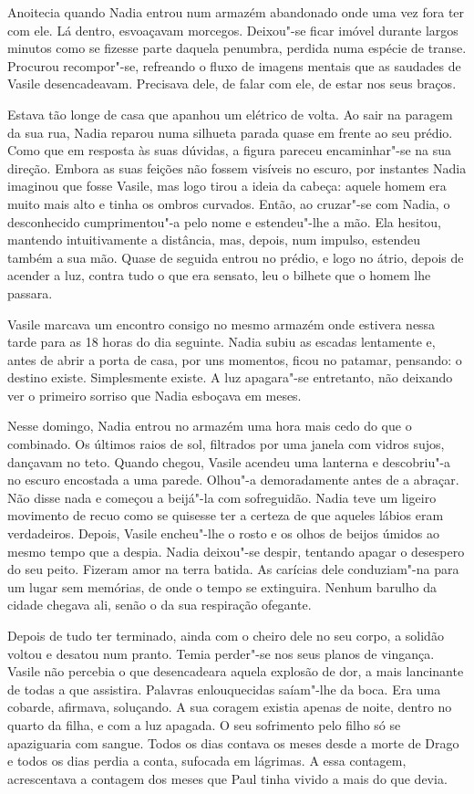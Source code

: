 Anoitecia quando Nadia entrou num armazém abandonado onde uma vez fora
ter com ele. Lá dentro, esvoaçavam morcegos. Deixou"-se ficar imóvel
durante largos minutos como se fizesse parte daquela penumbra, perdida
numa espécie de transe. Procurou recompor"-se, refreando o fluxo de
imagens mentais que as saudades de Vasile desencadeavam. Precisava dele,
de falar com ele, de estar nos seus braços.

Estava tão longe de casa que apanhou um elétrico de volta. Ao sair na
paragem da sua rua, Nadia reparou numa silhueta parada quase em frente
ao seu prédio. Como que em resposta às suas dúvidas, a figura pareceu
encaminhar"-se na sua direção. Embora as suas feições não fossem
visíveis no escuro, por instantes Nadia imaginou que fosse Vasile, mas
logo tirou a ideia da cabeça: aquele homem era muito mais alto e tinha
os ombros curvados. Então, ao cruzar"-se com Nadia, o desconhecido
cumprimentou"-a pelo nome e estendeu"-lhe a mão. Ela hesitou, mantendo
intuitivamente a distância, mas, depois, num impulso, estendeu também a
sua mão. Quase de seguida entrou no prédio, e logo no átrio, depois de
acender a luz, contra tudo o que era sensato, leu o bilhete que o
homem lhe passara.

Vasile marcava um encontro consigo no mesmo armazém onde estivera nessa tarde para as 18 horas do dia seguinte. Nadia
subiu as escadas lentamente e, antes de abrir a porta de casa, por uns
momentos, ficou no patamar, pensando: o destino existe. Simplesmente
existe. A luz apagara"-se entretanto, não deixando ver o primeiro sorriso
que Nadia esboçava em meses.

Nesse domingo, Nadia entrou no armazém uma hora mais cedo do que o
combinado. Os últimos raios de sol, filtrados por uma janela com vidros
sujos, dançavam no teto. Quando chegou, Vasile acendeu uma lanterna e
descobriu"-a no escuro encostada a uma parede. Olhou"-a demoradamente
antes de a abraçar. Não disse nada e começou a beijá"-la com sofreguidão.
Nadia teve um ligeiro movimento de recuo como se quisesse ter a certeza
de que aqueles lábios eram verdadeiros. Depois, Vasile encheu"-lhe o
rosto e os olhos de beijos úmidos ao mesmo tempo que a despia. Nadia
deixou"-se despir, tentando apagar o desespero do seu peito. Fizeram
amor na terra batida. As carícias dele conduziam"-na para um lugar sem
memórias, de onde o tempo se extinguira. Nenhum barulho da cidade
chegava ali, senão o da sua respiração ofegante.

Depois de tudo ter terminado, ainda com o cheiro dele
no seu corpo, a solidão voltou e desatou num pranto. Temia perder"-se nos
seus planos de vingança. Vasile não percebia o que desencadeara aquela
explosão de dor, a mais lancinante de todas a que assistira. Palavras
enlouquecidas saíam"-lhe da boca. Era uma cobarde, afirmava, soluçando.
A sua coragem existia apenas de noite, dentro no quarto da filha, e com
a luz apagada. O seu sofrimento pelo filho só se apaziguaria com sangue.
Todos os dias contava os meses desde a morte de Drago e todos os dias
perdia a conta, sufocada em lágrimas. A essa contagem, acrescentava a
contagem dos meses que Paul tinha vivido a mais do que devia.

